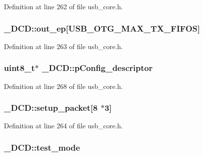 Definition at line 262 of file usb\-\_\-core.\-h.

\hypertarget{struct___d_c_d_ac3ccf3f4349515a84f147bb2f33cf5d8}{
\subsubsection[{out\-\_\-ep}]{ \-\_\-\-D\-C\-D\-::out\-\_\-ep\mbox{[}U\-S\-B\-\_\-\-O\-T\-G\-\_\-\-M\-A\-X\-\_\-\-T\-X\-\_\-\-F\-I\-F\-O\-S\mbox{]}}}\label{struct___d_c_d_ac3ccf3f4349515a84f147bb2f33cf5d8}


Definition at line 263 of file usb\-\_\-core.\-h.

\hypertarget{struct___d_c_d_ad31ad0fdc64abffd21b7fc7ffbf06a3f}{
\subsubsection[{p\-Config\-\_\-descriptor}]{ {\bf uint8\-\_\-t}$\ast$ \-\_\-\-D\-C\-D\-::p\-Config\-\_\-descriptor}}\label{struct___d_c_d_ad31ad0fdc64abffd21b7fc7ffbf06a3f}


Definition at line 268 of file usb\-\_\-core.\-h.

\hypertarget{struct___d_c_d_a2615c2d71fc118bdefb6c0977868e584}{
\subsubsection[{setup\-\_\-packet}]{ \-\_\-\-D\-C\-D\-::setup\-\_\-packet\mbox{[}8 $\ast$3\mbox{]}}}\label{struct___d_c_d_a2615c2d71fc118bdefb6c0977868e584}


Definition at line 264 of file usb\-\_\-core.\-h.

\hypertarget{struct___d_c_d_ae0e60d9096dd9ef454fa7ff632ea336b}{
\subsubsection[{test\-\_\-mode}]{ \-\_\-\-D\-C\-D\-::test\-\_\-mode}}\label{struct___d_c_d_ae0e60d9096dd9ef454fa7ff632ea336b}


